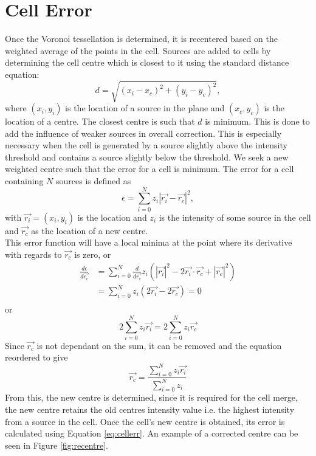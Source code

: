 \section{Cell Error}
Once the Voronoi tessellation is determined, it is recentered based on the weighted average of the points in the cell. Sources are added to cells by determining the cell centre which is closest to it using the standard distance equation:
\begin{equation}
d = \sqrt{(x_i - x_c)^2 + (y_i - y_c)^2},
\end{equation}
where $(x_i,y_i)$ is the location of a source in the plane and $(x_c,y_c)$ is the location of a centre. The closest centre is such that $d$ is minimum. This is done to add the influence of weaker sources in overall correction. This is especially necessary when the cell is generated by a source slightly above the intensity threshold and contains a source slightly below the threshold. We seek a new weighted centre such that the error for a cell is minimum. The error for a cell containing $N$ sources is defined as
\begin{equation} \label{eq:cellerr}
	\epsilon = \sum^N_{i=0} z_i|\vec{r_i} - \vec{r_c}|^2,
\end{equation}
with $\vec{r_i} = (x_i,y_i)$ is the location and $z_i$ is the intensity of some source in the cell and $\vec{r_c}$ as the location of a new centre. 
\\
This error function will have a local minima at the point where its derivative with regards to $\vec{r_c}$ is zero, or
\begin{align*}
	\frac{d\epsilon}{d\vec{r_c}} &= \sum^N_{i=0} \frac{d}{d\vec{r_c}}z_i(|\vec{r_i}|^2 -2\vec{r_i}\cdot\vec{r_c} + |\vec{r_c}|^2) \\
	&= \sum^N_{i=0} z_i(2\vec{r_i} - 2\vec{r_c}) = 0 \\
\end{align*}
or
\begin{equation*}
	2\sum^N_{i=0} z_i\vec{r_i} = 2\sum^N_{i=0}z_i\vec{r_c}
\end{equation*}
Since $\vec{r_c}$ is not dependant on the sum, it can be removed and the equation reordered to give
\begin{equation}
	\vec{r_c} = \frac{\sum^N_{i=0} z_i\vec{r_i}}{\sum^N_{i=0}z_i}
\end{equation}
From this, the new centre is determined, since it is required for the cell merge, the new centre retains the old centres intensity value i.e. the highest intensity from a source in the cell. Once the cell's new centre is obtained, its error is calculated using Equation \ref{eq:cellerr}. An example of a corrected centre can be seen in Figure \ref{fig:recentre}.
